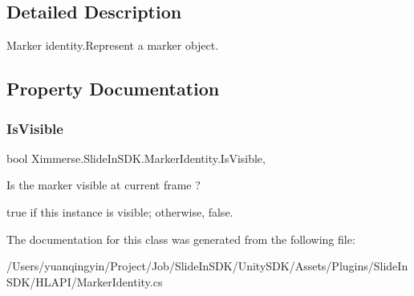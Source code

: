 \subsection{Detailed Description}
Marker identity.\+Represent a marker object. 



\subsection{Property Documentation}
\mbox{\label{class_ximmerse_1_1_slide_in_s_d_k_1_1_marker_identity_ac9b8916f50e7dd3aa8f8b2a30fab32f2}} 
\subsubsection{\texorpdfstring{Is\+Visible}{IsVisible}}
{\footnotesize\ttfamily bool Ximmerse.\+Slide\+In\+S\+D\+K.\+Marker\+Identity.\+Is\+Visible\hspace{0.3cm}{\ttfamily [get]}, {\ttfamily [set]}}



Is the marker visible at current frame ? 

{\ttfamily true} if this instance is visible; otherwise, {\ttfamily false}.

The documentation for this class was generated from the following file\+:\begin{DoxyCompactItemize}
\item 
/\+Users/yuanqingyin/\+Project/\+Job/\+Slide\+In\+S\+D\+K/\+Unity\+S\+D\+K/\+Assets/\+Plugins/\+Slide\+In\+S\+D\+K/\+H\+L\+A\+P\+I/Marker\+Identity.\+cs\end{DoxyCompactItemize}
